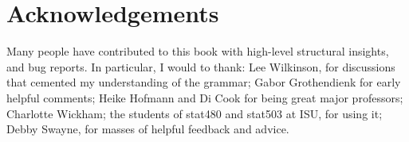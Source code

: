 \section{Acknowledgements}\label{sec:acknolwedgements}

Many people have contributed to this book with high-level structural insights, and bug reports.  In particular, I would to thank: Lee Wilkinson, for discussions that cemented my understanding of the grammar; Gabor Grothendienk for early helpful comments; Heike Hofmann and Di Cook for being great major professors; Charlotte Wickham; the students of stat480 and stat503 at ISU, for using it; Debby Swayne, for masses of helpful feedback and advice.


